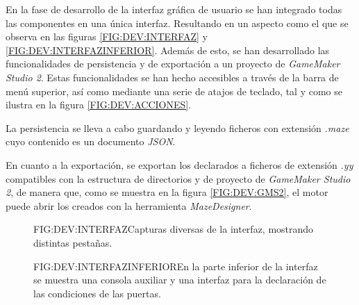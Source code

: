 En la fase de desarrollo de la interfaz gráfica de usuario se han integrado todas las componentes en una única interfaz. Resultando en un aspecto como el que se observa en las figuras \ref{FIG:DEV:INTERFAZ} y \ref{FIG:DEV:INTERFAZINFERIOR}.
Además de esto, se han desarrollado las funcionalidades de persistencia y de exportación a un proyecto de \textit{GameMaker Studio 2}. Estas funcionalidades se han hecho accesibles a través de la barra de menú superior, así como mediante una serie de atajos de teclado, tal y como se ilustra en la figura \ref{FIG:DEV:ACCIONES}.

La persistencia se lleva a cabo guardando y leyendo ficheros con extensión \textit{.maze} cuyo contenido es un documento \textit{JSON}.

En cuanto a la exportación, se exportan los  declarados a ficheros de extensión \textit{.yy} compatibles con la estructura de directorios y de proyecto de \textit{GameMaker Studio 2}, de manera que, como se muestra en la figura \ref{FIG:DEV:GMS2}, el motor puede abrir los  creados con la herramienta \textit{MazeDesigner}.

\begin{figure}{FIG:DEV:INTERFAZ}{Capturas diversas de la interfaz, mostrando distintas pestañas.}
	 \quad
	 \quad
\end{figure}

\begin{figure}{FIG:DEV:INTERFAZINFERIOR}{En la parte inferior de la interfaz se muestra una consola auxiliar y una interfaz para la declaración de las condiciones de las puertas.}
	 \quad
\end{figure}

